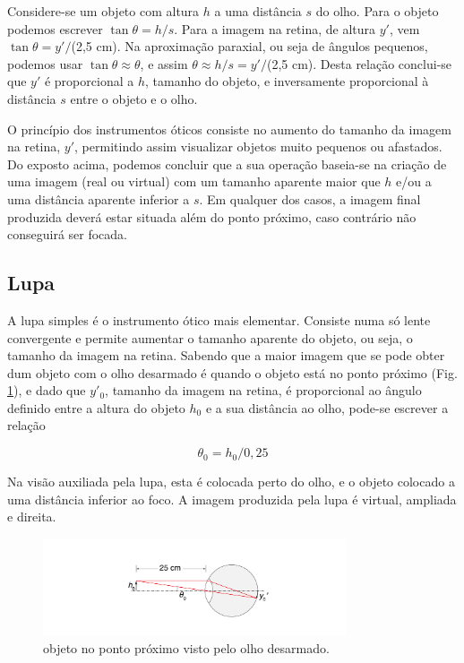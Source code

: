 \documentclass[12pt,a4paper,oneside]{paper}
\begin{document}
Considere-se um objeto com altura $h$ a uma distância $s$ do olho. Para o objeto podemos escrever $\tan\theta=h/s$.
Para a imagem na retina, de altura $y'$, vem $\tan\theta = y' /$(2,5 cm). Na aproximação paraxial, ou seja de ângulos pequenos,
podemos usar $\tan\theta \approx\theta$, e assim $\theta\approx h/s=y'/$(2,5 cm). Desta relação conclui-se que $y'$ é proporcional
a $h$, tamanho do objeto, e inversamente proporcional à distância $s$ entre o objeto e o olho. 


O princípio dos instrumentos óticos consiste no aumento do tamanho da imagem na retina, $y'$, permitindo assim visualizar objetos
muito pequenos ou afastados. Do exposto acima, podemos concluir que a sua operação baseia-se na criação de uma imagem (real ou virtual)
com um tamanho aparente maior que $h$ e/ou 
 a uma distância aparente inferior a $s$. Em qualquer dos casos, a imagem final produzida deverá estar situada além do
 ponto próximo, caso contrário não conseguirá ser focada.


\subsection{\sf Lupa}

A lupa simples é o instrumento ótico mais elementar. Consiste numa só lente convergente e permite aumentar o tamanho
aparente do objeto, ou seja, o tamanho da imagem na retina. Sabendo que a maior imagem que se pode obter dum objeto
com o olho desarmado é quando o objeto está no ponto próximo (Fig. \ref{fig:olho-4}), e dado que $y'_0$, tamanho da
imagem na retina, é proporcional ao ângulo definido entre a altura do objeto $h_0$ e a sua distância ao olho,
pode-se escrever a relação

\begin{equation}
\theta_0=h_0/0,25
\end{equation}

Na visão auxiliada pela lupa, esta é colocada perto do olho, e o objeto colocado a uma distância inferior ao foco. A imagem
produzida pela lupa é virtual, ampliada e direita.

\begin{figure}[H]
	\centering 
	\includegraphics[width=0.8\textwidth]{./otica_images/olho-4}
		\caption{objeto no ponto próximo visto pelo olho desarmado. \label{fig:olho-4}} 
\end{figure}
\end{document}
